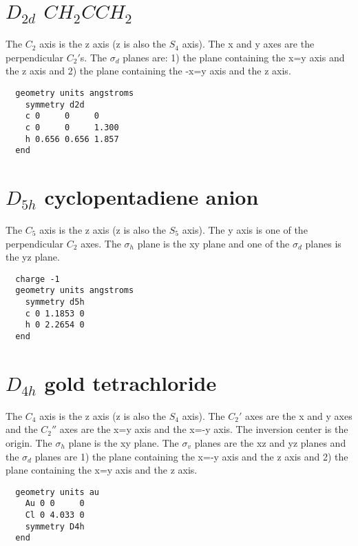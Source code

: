   \section{\protect$D_{2d}$ \protect$CH_2CCH_2$}

The $C_2$ axis is the z axis (z is also the $S_4$ axis).  The x and y axes
are the perpendicular $C_2'$s. The $\sigma_d$ planes are: 
1) the plane containing the x=y axis and the z axis and 2) the plane 
containing the -x=y axis and the z axis.

\begin{verbatim}
  geometry units angstroms
    symmetry d2d
    c 0     0     0 
    c 0     0     1.300 
    h 0.656 0.656 1.857 
  end
\end{verbatim}

  \section{\protect$D_{5h}$ cyclopentadiene anion}

The $C_5$ axis is the z axis (z is also the $S_5$ axis).  The y axis is one
of the perpendicular $C_2$ axes.  The $\sigma_h$ plane is the xy plane and
one of the $\sigma_d$ planes is the yz plane.

\begin{verbatim}
  charge -1
  geometry units angstroms
    symmetry d5h
    c 0 1.1853 0 
    h 0 2.2654 0 
  end
\end{verbatim}


  \section{\protect$D_{4h}$ gold tetrachloride}

The $C_4$ axis is the z axis (z is also the $S_4$ axis).  
The $C_2'$ axes are the x and y axes and the $C_2''$ axes are the x=y axis
and the x=-y axis.  The inversion center is the origin.  The $\sigma_h$
plane is the xy plane.  The $\sigma_v$ planes are the xz and yz planes and
the $\sigma_d$ planes are 1) the plane containing the x=-y axis and the z axis
and 2) the plane containing the x=y axis and the z axis.

\begin{verbatim}
  geometry units au
    Au 0 0     0 
    Cl 0 4.033 0
    symmetry D4h
  end
\end{verbatim}
